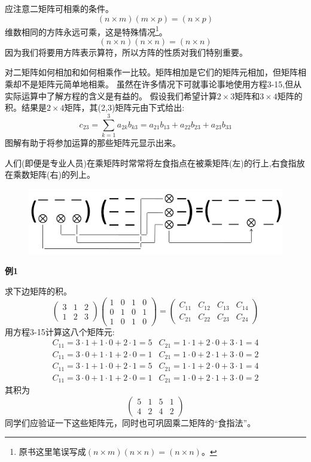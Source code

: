 应注意二矩阵可相乘的条件。
\[(n \times m)(m \times p)=(n \times p)\]
维数相同的方阵永远可乘，这是特殊情况\footnote{原书这里笔误写成$(n \times m)(n \times n)=(n \times n)$。}。
\[(n \times n)(n \times n)=(n \times n)\]
因为我们将要用方阵表示算符，所以方阵的性质对我们特别重要。

对二矩阵如何相加和如何相乘作一比较。矩阵相加是它们的矩阵元相加，但矩阵相乘却不是矩阵元简单地相乘。
虽然在许多情况下可就事论事地使用方程3-15,但从实际运算中了解方程的含义是有益的。
假设我们希望计算$2 \times 3$矩阵和$3 \times 4$矩阵的积。结果是$2 \times 4$矩阵，其(2,3)矩阵元由下式给出:
\[c_{23}=\sum_{k=1}^3a_{2k}b_{k3}=a_{21}b_{13}+a_{22}b_{23}+a_{23}b_{33} \tag{2-16}\]
图解有助于将参加运算的那些矩阵元显示出来。

人们(即便是专业人员)在乘矩阵时常常将左食指点在被乘矩阵(左)的行上,右食指放在乘数矩阵(右)的列上。

\begin{figure}[htbp]
    \centering
    \includegraphics[scale=0.22]{./fig/3-0.png}
\end{figure}

\textbf{例1}

求下边矩阵的积。
\[
\begin{pmatrix}
    3 & 1 & 2 \\
    1 & 2 & 3
\end{pmatrix}
\begin{pmatrix}
    1 & 0 & 1 & 0 \\
    0 & 1 & 0 & 1 \\
    1 & 0 & 1 & 0
\end{pmatrix}    
=
\begin{pmatrix}
    C_{11} & C_{12} & C_{13} & C_{14} \\
    C_{21} & C_{22} & C_{23} & C_{24}
\end{pmatrix} 
\]
用方程3-15计算这八个矩阵元:
\[
\begin{array}{ll}
    C_{11}=3 \cdot 1+1 \cdot 0+2 \cdot 1=5 & C_{21}=1 \cdot 1+2 \cdot 0+3 \cdot 1=4 \\
    C_{11}=3 \cdot 0+1 \cdot 1+2 \cdot 0=1 & C_{21}=1 \cdot 0+2 \cdot 1+3 \cdot 0=2 \\
    C_{11}=3 \cdot 1+1 \cdot 0+2 \cdot 1=5 & C_{21}=1 \cdot 1+2 \cdot 0+3 \cdot 1=4 \\
    C_{11}=3 \cdot 0+1 \cdot 1+2 \cdot 0=1 & C_{21}=1 \cdot 0+2 \cdot 1+3 \cdot 0=2
\end{array}    
\]
其积为
\[
\begin{pmatrix}
    5 & 1 & 5 & 1  \\
    4 & 2 & 4 & 2
\end{pmatrix}    
\]
同学们应验证一下这些矩阵元，同时也可巩固乘二矩阵的“食指法”。

